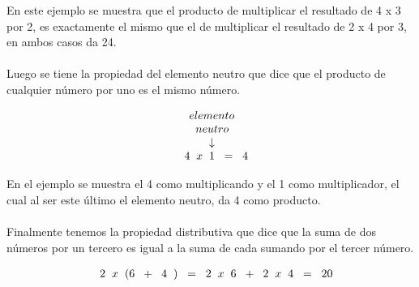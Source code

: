 \documentclass[10pt,journal,compsoc]{IEEEtran}
\begin{document}
En este ejemplo se muestra que el producto de multiplicar el resultado de 4 x 3 por 2, es exactamente el mismo que el de multiplicar el resultado de 2 x 4 por 3, en ambos casos da 24.
\\\\
Luego se tiene la propiedad del elemento neutro que dice que el producto de cualquier número por uno es el mismo número.

\begin{center}
\[
\begin{array}{rl l}
& \hspace{0.15cm} elemento \\
& \hspace{0.35cm} neutro \\
& \hspace{0.775cm} \downarrow \\
& 4 \hspace{0.2cm} x \hspace{0.2cm} 1 \hspace{0.2cm} = \hspace{0.2cm} 4 \\
\end{array}
\]
\end{center}

En el ejemplo se muestra el 4 como multiplicando y el 1 como multiplicador, el cual al ser este último el elemento neutro, da 4 como producto.
\\\\
Finalmente tenemos la propiedad distributiva que dice que la suma de dos números por un tercero es igual a la suma de cada sumando por el tercer número.

\begin{center}
\[
\begin{array}{rl l}
& 2 \hspace{0.2cm} x \hspace{0.2cm} ( 6 \hspace{0.2cm} + \hspace{0.2cm} 4 \hspace{0.2cm} ) \hspace{0.2cm} = \hspace{0.2cm} 2 \hspace{0.2cm} x \hspace{0.2cm} 6 \hspace{0.2cm} + \hspace{0.2cm} 2 \hspace{0.2cm} x \hspace{0.2cm} 4 \hspace{0.2cm} = \hspace{0.2cm} 20 \\
\end{array}
\]
\end{center}
\end{document}
